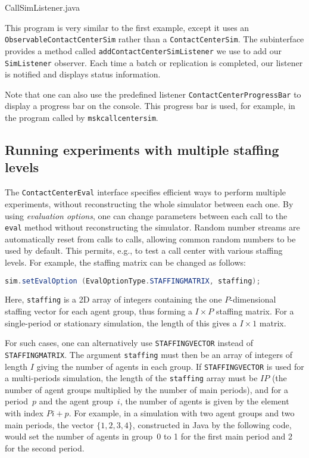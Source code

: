 
{CallSimListener.java}

This program is very similar to the first example, except it uses an
\texttt{Observable\-Contact\-Center\-Sim} rather than a
\texttt{Contact\-Center\-Sim}.  The subinterface provides a method
called \texttt{add\-Contact\-Center\-Sim\-Listener} we
use to add our \texttt{Sim\-Listener} observer.  Each time a batch or
replication is completed, our listener is notified and displays status
information.

Note that one can
also use the predefined listener
\texttt{Contact\-Center\-Progress\-Bar} to display a progress bar on
the console.
This progress bar is used, for example, in the program called by
\texttt{mskcallcentersim}.

\subsection{Running experiments with multiple staffing levels}
\label{sec:multipleexp}

The \texttt{Contact\-Center\-Eval} interface specifies efficient ways
to perform multiple experiments, without reconstructing the whole
simulator between each one.  By using \emph{evaluation options}, one
can change parameters between each call to the \texttt{eval}
method without reconstructing the simulator.  Random number streams
are automatically reset from calls to
calls, allowing common random numbers to be used by default.  This
permits, e.g.,
to test a call center with various staffing levels.
For example, the staffing matrix can be changed as follows:

\begin{lstlisting}[language=Java,frame={}]
   sim.setEvalOption (EvalOptionType.STAFFINGMATRIX, staffing);
\end{lstlisting}

Here, \texttt{staffing} is a 2D array of integers containing the
one $P$-dimensional staffing vector for each agent group, thus forming
a $I\times P$ staffing matrix.
For a single-period or stationary simulation, the length of this
gives a $I\times 1$ matrix.

For such cases, one can alternatively use \texttt{STAFFINGVECTOR}
instead of \texttt{STAFFINGMATRIX}.  The argument \texttt{staffing}
must then be an array of integers of length $I$ giving the number of
agents in each group.
If \texttt{STAFFINGVECTOR} is used for
a multi-periods simulation, the length of the \texttt{staffing} array
must be $IP$ (the number of agent groups multiplied by the number of
main periods), and
for a period~$p$ and the agent group~$i$,
the number of agents is given by the element with index
$Pi + p$.  For example, in a simulation with two agent groups
and two main periods, the vector
$\{1,2,3,4\}$, constructed in Java by the following code,
would set the number of
agents in group~0 to 1 for the first
main period and 2 for the second period.

